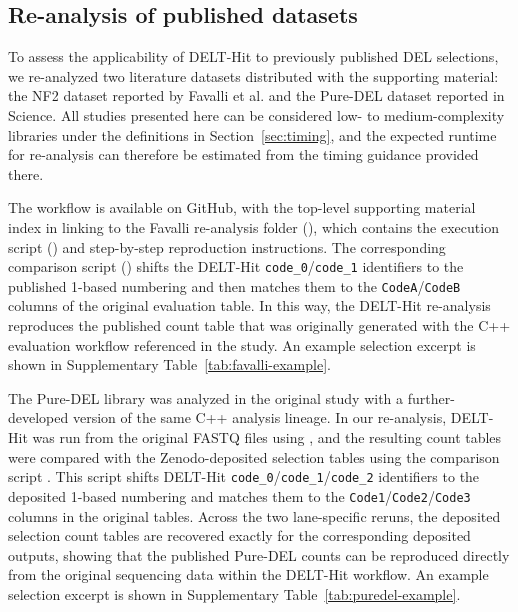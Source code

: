 \subsection{Re-analysis of published datasets}
\label{supp:analysis-of-published-datasets}

To assess the applicability of DELT-Hit to previously published DEL selections, we re-analyzed two literature datasets distributed with the supporting material: the NF2 dataset reported by Favalli et al.\cite{favalli_stereoregiodefineddnaencoded_2021} and the Pure-DEL dataset reported in Science\cite{keller_highlypurednaencoded_2024}. All studies presented here can be considered low- to medium-complexity libraries under the definitions in Section~\ref{sec:timing}, and the expected runtime for re-analysis can therefore be estimated from the timing guidance provided there.

{\sloppy
The workflow is available on GitHub, with the top-level supporting material index in  linking to the Favalli re-analysis folder (), which contains the execution script () and step-by-step reproduction instructions. The corresponding comparison script () shifts the DELT-Hit \texttt{code\_0}/\texttt{code\_1} identifiers to the published 1-based numbering and then matches them to the \texttt{CodeA}/\texttt{CodeB} columns of the original evaluation table. In this way, the DELT-Hit re-analysis reproduces the published count table that was originally generated with the C++ evaluation workflow referenced in the study. An example selection excerpt is shown in Supplementary Table~\ref{tab:favalli-example}.

The Pure-DEL library was analyzed in the original study with a further-developed version of the same C++ analysis lineage. In our re-analysis, DELT-Hit was run from the original FASTQ files using , and the resulting count tables were compared with the Zenodo-deposited selection tables using the comparison script . This script shifts DELT-Hit \texttt{code\_0}/\texttt{code\_1}/\texttt{code\_2} identifiers to the deposited 1-based numbering and matches them to the \texttt{Code1}/\texttt{Code2}/\texttt{Code3} columns in the original tables. Across the two lane-specific reruns, the deposited selection count tables are recovered exactly for the corresponding deposited outputs, showing that the published Pure-DEL counts can be reproduced directly from the original sequencing data within the DELT-Hit workflow. An example selection excerpt is shown in Supplementary Table~\ref{tab:puredel-example}.
\par}

